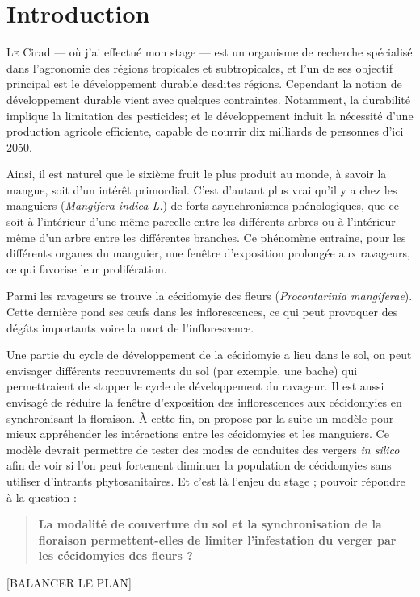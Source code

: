 \chapter{Introduction}

\lettrine{L}{e} Cirad --- où j'ai effectué mon stage --- est un organisme de recherche spécialisé dans l'agronomie des régions tropicales et subtropicales, et l'un de ses objectif principal est le développement durable desdites régions.
Cependant la notion de développement durable vient avec quelques contraintes.
Notamment, la durabilité implique la limitation des pesticides; et le développement induit la nécessité d'une production agricole efficiente, capable de nourrir dix milliards de personnes d'ici 2050.

Ainsi, il est naturel que le sixième fruit le plus produit au monde, à savoir la mangue, soit d'un intérêt primordial.
C'est d'autant plus vrai qu'il y a chez les manguiers (\emph{Mangifera indica L.}) de forts asynchronismes phénologiques, que ce soit à l'intérieur d'une même parcelle entre les différents arbres ou à l'intérieur même d'un arbre entre les différentes branches. 
Ce phénomène entraîne, pour les différents organes du manguier, une fenêtre d'exposition prolongée aux ravageurs, ce qui favorise leur prolifération.


Parmi les ravageurs se trouve la cécidomyie des fleurs (\emph{Procontarinia mangiferae}). Cette dernière pond ses œufs dans les inflorescences, ce qui peut provoquer des dégâts importants voire la mort de l'inflorescence.

Une partie du cycle de développement de la cécidomyie a lieu dans le sol, on peut envisager différents recouvrements du sol (par exemple, une bache) qui permettraient de stopper le cycle de développement du ravageur.
Il est aussi envisagé de réduire la fenêtre d'exposition des inflorescences aux cécidomyies en synchronisant la floraison.
À cette fin, on propose par la suite un modèle pour mieux appréhender les intéractions entre les cécidomyies et les manguiers.
Ce modèle devrait permettre de tester des modes de conduites des vergers \emph{in silico} afin de voir si l'on peut fortement diminuer la population de cécidomyies sans utiliser d'intrants phytosanitaires.
Et c'est là l'enjeu du stage ; pouvoir répondre à la question :
\begin{quote}
 \textbf{La modalité de couverture du sol et la synchronisation de la floraison permettent-elles de limiter l'infestation du verger par les cécidomyies des fleurs ?}
\end{quote}

[BALANCER LE PLAN]
